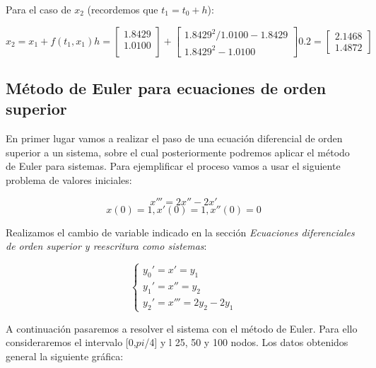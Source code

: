 \documentclass[12pt]{article}       %
\begin{document}
Para el caso de $x_2$ (recordemos que $t_1=t_0+h$):

\begin{equation*}
x_2=x_1+f(t_1,x_1)h=\begin{bmatrix}
1.8429\\
1.0100\\
\end{bmatrix} + \begin{bmatrix}
1.8429^2/1.0100 - 1.8429\\
1.8429^2 - 1.0100
\end{bmatrix}0.2=\begin{bmatrix}
2.1468\\
1.4872
\end{bmatrix}  
\end{equation*}

\subsection{Método de Euler para ecuaciones de orden superior}
 
En primer lugar vamos a realizar el paso de una ecuación diferencial de orden superior a un sistema, sobre el cual posteriormente podremos aplicar el método de Euler para sistemas. Para ejemplificar el proceso vamos a usar el siguiente problema de valores iniciales: 

$$
x''' = 2x'' - 2x'     %
$$
$$
x(0)=1, x'(0)=1, x''(0)=0
$$

Realizamos el cambio de variable indicado en la sección \textit{Ecuaciones diferenciales de orden superior y reescritura como sistemas}:

$$
\begin{cases}
y_0' = x' = y_1\\
y_1' = x'' = y_2\\
y_2' = x''' = 2y_2 - 2y_1
\end{cases}
$$

A continuación pasaremos a resolver el sistema con el método de Euler. Para ello consideraremos el intervalo [0,$pi$/4] y l 25, 50 y 100 nodos. Los datos obtenidos general la siguiente gráfica: 
\end{document}
